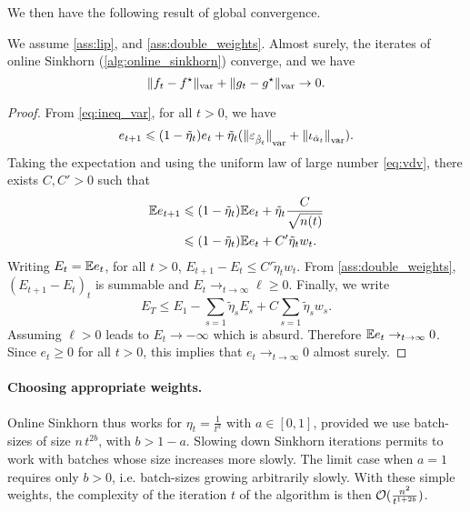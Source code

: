 We then have the following result of global convergence.

\begin{proposition}\label{prop:convergence_true}
    We assume \autoref{ass:lip}, and
    \ref{ass:double_weights}. Almost surely, the iterates of online Sinkhorn
    (\autoref{alg:online_sinkhorn}) converge, and we have
    \begin{equation}
        \Vert f_t - f^\star \Vert_{\text{\upshape var}} + \Vert g_t - g^\star \Vert_{\text{\upshape var}} \to 0.
    \end{equation}
\end{proposition}


\begin{proof}
From \eqref{eq:ineq_var}, for all $t > 0$, we have
\begin{equation}
    e_{t+1} \leqslant 
    (1 - \tilde \eta_t) e_t
    + \tilde \eta_t
    ({\Vert \varepsilon_{\hat \beta_t} \Vert}_{\text{\upshape var}} + 
    {\Vert \iota_{\hat \alpha_t} \Vert}_{\text{\upshape var}}).
\end{equation}
Taking the expectation and using the uniform law of 
large number \eqref{eq:vdv}, there exists $C, C' > 0$ such that
\begin{align}
    \mathbb{E} e_{t+1} &\leqslant (1 - \tilde \eta_t) \mathbb{E} e_t + \tilde \eta_t \frac{C}{\sqrt{n(t)}} \\
    &\leqslant (1 - \tilde \eta_t) \mathbb{E} e_t + C' \tilde \eta_t w_t.
\end{align}
Writing $E_t = \mathbb{E} e_t$, for all $t > 0$, $E_{t+1} - E_t \leq C' \tilde \eta_t w_t$. 
From \autoref{ass:double_weights}, ${(E_{t+1} - E_t)}_t$ is summable and $E_t \to_{t
\to \infty} \ell \geq 0$. Finally, we write
\begin{equation}
    E_T \leq E_1 - \sum_{s=1} \tilde \eta_s E_s + C\sum_{s=1} \tilde \eta_s w_s.
\end{equation}
Assuming $\ell > 0$ leads to $E_t \to -\infty$ which is absurd. Therefore $\mathbb{E}
e_t \to_{t \to \infty} 0$. Since $e_t \geq 0$ for all $t > 0$, this implies that
$e_t \to_{t \to \infty} 0$ almost surely.
\end{proof}

\paragraph{Choosing appropriate weights.}

Online Sinkhorn thus works for $\eta_t = \frac{1}{t^a}$ with $a \in [0, 1]$,
provided we use batch-sizes of size $n\, t^{2b}$, with $b > 1 - a$.
Slowing down Sinkhorn iterations permits to work with batches whose size
increases more slowly. The limit case when $a = 1$ requires only $b > 0$, i.e.
batch-sizes growing arbitrarily slowly. With these simple weights, the complexity of the
iteration $t$ of the algorithm is then $\mathcal{O}(\frac{n^2}{t^{1 + 2b}})$.

